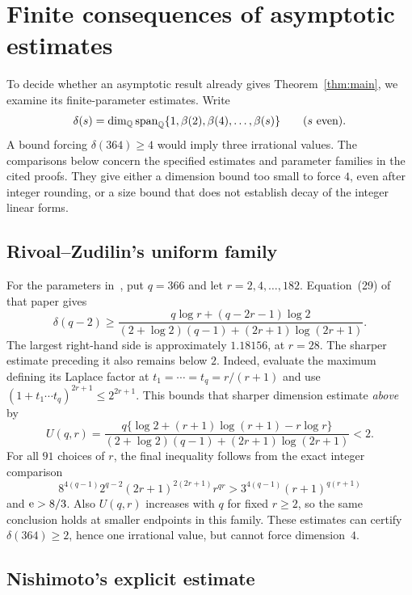 \section{Finite consequences of asymptotic estimates}
\label{sec:asymptotic-comparisons}

To decide whether an asymptotic result already gives
Theorem~\ref{thm:main}, we examine its finite-parameter estimates.
Write
\[
 \delta(s)=\dim_{\mathbb Q}\operatorname{span}_{\mathbb Q}
             \{1,\beta(2),\beta(4),\ldots,\beta(s)\}
 \qquad(s\text{ even}).
\]
A bound forcing $\delta(364)\geq4$ would imply three irrational values.
The comparisons below concern the specified estimates and parameter
families in the cited proofs. They give either a dimension bound too
small to force $4$, even after integer rounding, or a size bound that
does not establish decay of the integer linear forms.

\subsection{Rivoal--Zudilin's uniform family}

For the parameters in~\cite[(26)]{RZ03}, put $q=366$ and let
$r=2,4,\ldots,182$. Equation~(29) of that paper gives
\[
 \delta(q-2)\geq
 \frac{q\log r+(q-2r-1)\log2}
 {(2+\log2)(q-1)+(2r+1)\log(2r+1)}.
\]
The largest right-hand side is approximately $1.18156$, at $r=28$.
The sharper estimate preceding it also remains below $2$.
Indeed, evaluate the maximum defining its Laplace factor at
$t_1=\cdots=t_q=r/(r+1)$ and use
$(1+t_1\cdots t_q)^{2r+1}\leq2^{2r+1}$.
This bounds that sharper dimension estimate \emph{above} by
\begin{equation}\label{eq:rz-comparison}
 U(q,r)=\frac{q\{\log2+(r+1)\log(r+1)-r\log r\}}
 {(2+\log2)(q-1)+(2r+1)\log(2r+1)}<2.
\end{equation}
For all $91$ choices of $r$, the final inequality follows from the exact
integer comparison
\[
 8^{4(q-1)}2^{q-2}(2r+1)^{2(2r+1)}r^{qr}
 >3^{4(q-1)}(r+1)^{q(r+1)}
\]
and $\mathrm e>8/3$. Also $U(q,r)$ increases with $q$ for fixed $r\geq2$,
so the same conclusion holds at smaller endpoints in this family.
These estimates can certify $\delta(364)\geq2$, hence one irrational
value, but cannot force dimension~$4$.

\subsection{Nishimoto's explicit estimate}

